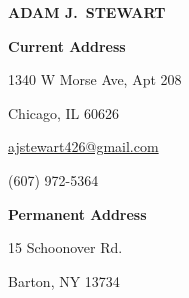 
\begin{center}

    \textbf{\uppercase{\Large Adam J.\ Stewart}}

\end{center}

\vspace{-12pt}

\begin{multicols}{3}

    \begin{flushleft}

        \textbf{Current Address}

        1340 W Morse Ave, Apt 208

        Chicago, IL 60626

    \end{flushleft}

    \columnbreak

    \begin{center}

        \href{mailto:ajstewart426@gmail.com}{ajstewart426@gmail.com}

        (607) 972-5364

    \end{center}

    \columnbreak

    \begin{flushright}

        \textbf{Permanent Address}

        15 Schoonover Rd.

        Barton, NY 13734

    \end{flushright}

\end{multicols}
